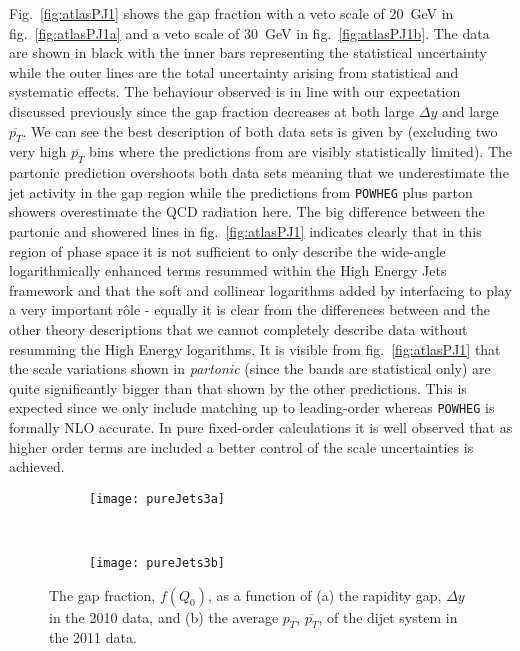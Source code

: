 	Fig.~\eqref{fig:atlasPJ1} shows the gap fraction with a veto scale of $20$~GeV in
	fig.~\eqref{fig:atlasPJ1a} and a veto scale of $30$~GeV in fig.~\eqref{fig:atlasPJ1b}.
	The data are shown in black with the inner bars representing the statistical uncertainty
	while the outer lines are the total uncertainty arising from statistical and systematic
	effects.  The behaviour observed is in line with our expectation discussed previously since the
	gap fraction decreases at both large $\Delta y$ and large $\overline{p_T}$.  We can see the
	best description of both data sets is given by \HEJA (excluding two very high $\overline{p_T}$
	bins where the predictions from \HEJA are visibly statistically limited). The partonic \HEJ
	prediction overshoots both data sets meaning that we underestimate the jet activity in the
	gap region while the predictions from \texttt{POWHEG} plus parton showers overestimate the
	QCD radiation here.  The big difference between the partonic and showered \HEJ lines in
	fig.~\eqref{fig:atlasPJ1} indicates clearly that in this region of phase space it
	is not sufficient to only describe the wide-angle logarithmically enhanced terms resummed
	within the High Energy Jets framework and that the soft and collinear logarithms added by
	interfacing to \ARIADNE play a very important r\^ole - equally it is clear from the
	differences between \HEJ and the other theory descriptions that we cannot
	completely describe data without resumming the High Energy logarithms.  It is visible from
	fig.~\eqref{fig:atlasPJ1} that the scale variations shown in \emph{partonic} \HEJ (since the
	\HEJA bands are statistical only) are quite significantly bigger than that shown by the other
	predictions.  This is expected since we only include matching up to leading-order whereas
	\texttt{POWHEG} is formally NLO accurate.  In pure fixed-order calculations it is well
	observed that as higher order terms are included a better control of the scale uncertainties
	is achieved.

	\begin{figure}[bth]
		\centering
		\begin{subfigure}[b]{0.48\textwidth}
			\texttt{[image: pureJets3a]}
			\caption{}
			\label{fig:atlasPJ1a}
		\end{subfigure}
		~
		\begin{subfigure}[b]{0.48\textwidth}
			\texttt{[image: pureJets3b]}
			\caption{}
			\label{fig:atlasPJ1b}
		\end{subfigure}
		\caption{The gap fraction, $f(Q_0)$, as a function of (a) the rapidity gap,
		$\Delta y$ in the 2010 data, and (b) the average $p_T$, $\overline{p_T}$, of
		the dijet system in the 2011 data.}
		\label{fig:atlasPJ1}
	\end{figure}

